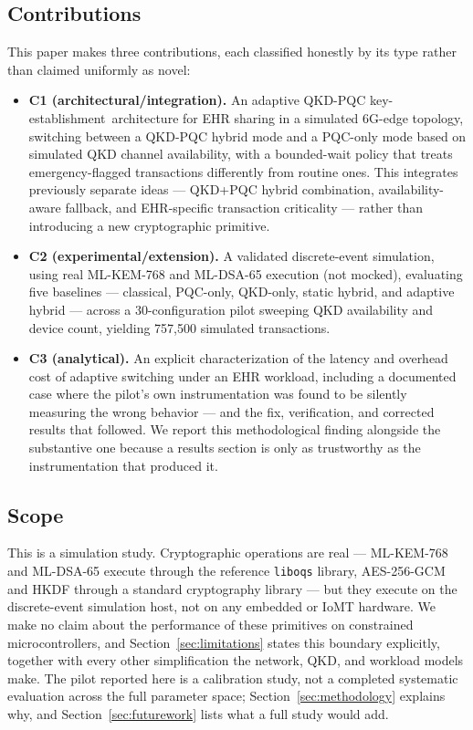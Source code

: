 \documentclass[journal]{IEEEtran}
\newcommand{\keyest}{key-establishment}
\begin{document}
\subsection{Contributions}

This paper makes three contributions, each classified honestly by its type rather than claimed uniformly as novel:

\begin{itemize}
\item \textbf{C1 (architectural/integration).} An adaptive QKD-PQC \keyest\ architecture for EHR sharing in a simulated 6G-edge topology, switching between a QKD-PQC hybrid mode and a PQC-only mode based on simulated QKD channel availability, with a bounded-wait policy that treats emergency-flagged transactions differently from routine ones. This integrates previously separate ideas --- QKD+PQC hybrid combination, availability-aware fallback, and EHR-specific transaction criticality --- rather than introducing a new cryptographic primitive.
\item \textbf{C2 (experimental/extension).} A validated discrete-event simulation, using real ML-KEM-768 and ML-DSA-65 execution (not mocked), evaluating five baselines --- classical, PQC-only, QKD-only, static hybrid, and adaptive hybrid --- across a 30-configuration pilot sweeping QKD availability and device count, yielding 757{,}500 simulated transactions.
\item \textbf{C3 (analytical).} An explicit characterization of the latency and overhead cost of adaptive switching under an EHR workload, including a documented case where the pilot's own instrumentation was found to be silently measuring the wrong behavior --- and the fix, verification, and corrected results that followed. We report this methodological finding alongside the substantive one because a results section is only as trustworthy as the instrumentation that produced it.
\end{itemize}

\subsection{Scope}

This is a simulation study. Cryptographic operations are real --- ML-KEM-768 and ML-DSA-65 execute through the reference \texttt{liboqs} library, AES-256-GCM and HKDF through a standard cryptography library --- but they execute on the discrete-event simulation host, not on any embedded or IoMT hardware. We make no claim about the performance of these primitives on constrained microcontrollers, and Section~\ref{sec:limitations} states this boundary explicitly, together with every other simplification the network, QKD, and workload models make. The pilot reported here is a calibration study, not a completed systematic evaluation across the full parameter space; Section~\ref{sec:methodology} explains why, and Section~\ref{sec:futurework} lists what a full study would add.
\end{document}
